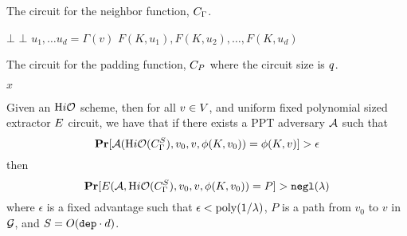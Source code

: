 \begin{algorithm}[H]
	\caption{
		The circuit for the neighbor function, $C_\Gamma$.
	}
	\begin{algorithmic}[1]
				\State \Return $\bot$
			\EndIf
				\State \Return $\bot$
			\EndIf
			\State $u_1, \dots u_d = \Gamma(v)$
			\State \Return $F(K, u_1), F(K, u_2), \dots, F(K, u_d)$
		\EndFunction
	\end{algorithmic}
	\label{alg:neighb}
\end{algorithm}

\begin{algorithm}[H]
	\caption{
		The circuit for the padding function, ${C_P}$ where the circuit size is $q$.
	}
	\begin{algorithmic}[1]
			\State \Return $x$
		\EndFunction
	\end{algorithmic}
	\label{alg:pad}
\end{algorithm}

\begin{theorem}
	\label{thm:labelExtract}
	Given an $\text{H}i\mathcal{O}$ scheme, then
	for all $v \in V$, and uniform fixed polynomial sized extractor $E$ circuit, we have that if there
	exists a PPT adversary $\mathcal{A}$ such that
	\begin{equation}
		\operatorname*{\mathbf{Pr}}[\mathcal{A}(\text{H}i\mathcal{O}({C_\Gamma^S}), v_0, v, \phi(K, v_0)) = \phi(K, v)] > \epsilon		
	\end{equation}	
	then
	\begin{equation}
		\operatorname*{\mathbf{Pr}}[E(\mathcal{A}, \text{H}i\mathcal{O}({C_\Gamma^S}), v_0, v, \phi(K, v_0)) = P] > \texttt{negl}(\lambda)
	\end{equation}
	where $\epsilon$ is a fixed advantage such that $\epsilon < \operatorname{poly}(1 / \lambda)$,
	$P$ is a path from $v_0$ to $v$ in $\mathcal{G}$, 
	and $S = O(\texttt{dep} \cdot d)$.
\end{theorem}